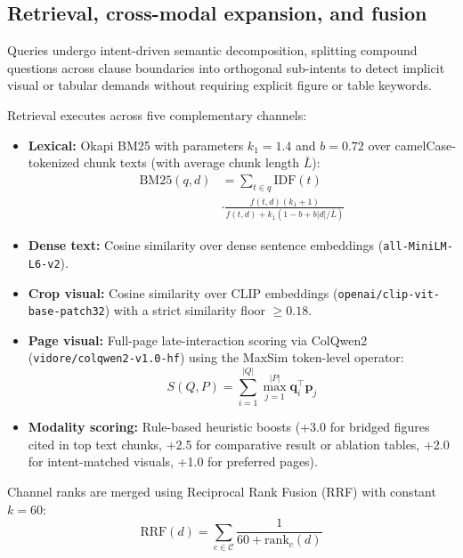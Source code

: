 \subsection{Retrieval, cross-modal expansion, and fusion}
Queries undergo intent-driven semantic decomposition, splitting compound questions across clause boundaries into orthogonal sub-intents to detect implicit visual or tabular demands without requiring explicit figure or table keywords.

Retrieval executes across five complementary channels:
\begin{itemize}
    \setlength{\itemsep}{0pt}\setlength{\parskip}{0pt}
    \item \textbf{Lexical:} Okapi BM25 \citep{robertson2009bm25} with parameters $k_1 = 1.4$ and $b = 0.72$ over camelCase-tokenized chunk texts (with average chunk length $\bar{L}$):
    \begin{equation}
    \begin{aligned}
    \text{BM25}(q, d) &= \sum_{t \in q} \text{IDF}(t) \\
    &\cdot \frac{f(t, d)(k_1 + 1)}{f(t, d) + k_1 (1 - b + b |d| / \bar{L})}
    \end{aligned}
    \end{equation}
    \item \textbf{Dense text:} Cosine similarity over dense sentence embeddings (\texttt{all-MiniLM-L6-v2}).
    \item \textbf{Crop visual:} Cosine similarity over CLIP embeddings (\texttt{openai/}\allowbreak\texttt{clip-vit-}\allowbreak\texttt{base-patch32}) with a strict similarity floor $\ge 0.18$.
    \item \textbf{Page visual:} Full-page late-interaction scoring via ColQwen2 (\texttt{vidore/}\allowbreak\texttt{colqwen2-}\allowbreak\texttt{v1.0-hf}) using the MaxSim token-level operator:
    \begin{equation}
    S(Q, P) = \sum_{i=1}^{|Q|} \max_{j=1}^{|P|} \mathbf{q}_i^\top \mathbf{p}_j
    \end{equation}
    \item \textbf{Modality scoring:} Rule-based heuristic boosts (+3.0 for bridged figures cited in top text chunks, +2.5 for comparative result or ablation tables, +2.0 for intent-matched visuals, +1.0 for preferred pages).
\end{itemize}

Channel ranks are merged using Reciprocal Rank Fusion (RRF) with constant $k = 60$:
\begin{equation}
\text{RRF}(d) = \sum_{c \in \mathcal{C}} \frac{1}{60 + \text{rank}_c(d)}
\end{equation}

